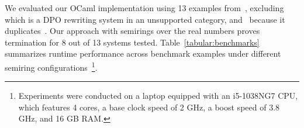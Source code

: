 We evaluated our OCaml implementation using 13 examples from~\cite{endrullis2024generalized_arxiv_v2,plump1995ontermination,plump2018modular,bruggink2015proving,bruggink2014termination}, excluding~\cite[Example 6.4]{endrullis2024generalized_arxiv_v2} which is a DPO rewriting system in an unsupported category, and~\cite[Example 6]{bruggink2014termination} because it duplicates~\cite[Example 4]{bruggink2015proving}. Our approach with semirings over the real numbers proves termination for 8 out of 13 systems tested. Table~\ref{tabular:benchmarks} summarizes runtime performance 
across benchmark examples under different semiring configurations~\footnote{Experiments were conducted on a laptop equipped with an i5-1038NG7 CPU, which features 4 cores, a base clock speed of 2 GHz, a boost speed of 3.8 GHz, and 16 GB RAM.}.



